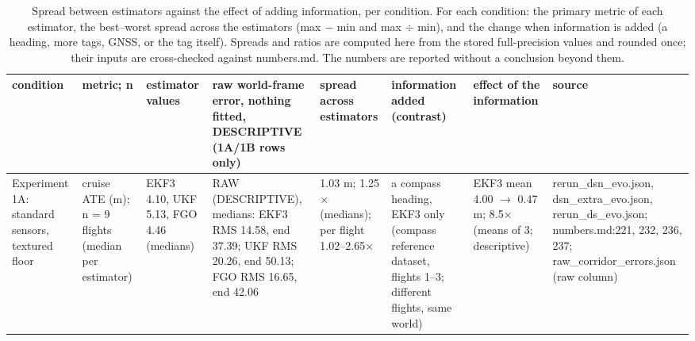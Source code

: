 \begin{table}[htbp]
\centering
\scriptsize
\caption{Spread between estimators against the effect of adding information, per condition. For each condition: the primary metric of each estimator, the best--worst spread across the estimators (max $-$ min and max $\div$ min), and the change when information is added (a heading, more tags, GNSS, or the tag itself). Spreads and ratios are computed here from the stored full-precision values and rounded once; their inputs are cross-checked against numbers.md. The numbers are reported without a conclusion beyond them.}
\label{tab:R4_information_vs_estimator}
\begin{tabular}{p{}p{}p{}p{}p{}p{}p{}p{}}
\toprule
\textbf{condition} & \textbf{metric; n} & \textbf{estimator values} & \textbf{raw world-frame error, nothing fitted, DESCRIPTIVE (1A/1B rows only)} & \textbf{spread across estimators} & \textbf{information added (contrast)} & \textbf{effect of the information} & \textbf{source} \\
\midrule
Experiment 1A: standard sensors, textured floor & cruise ATE (m); n = 9 flights (median per estimator) & EKF3 4.10, UKF 5.13, FGO 4.46 (medians) & RAW (DESCRIPTIVE), medians: EKF3 RMS 14.58, end 37.39; UKF RMS 20.26, end 50.13; FGO RMS 16.65, end 42.06 & 1.03 m; 1.25$\times$ (medians); per flight 1.02--2.65$\times$ & a compass heading, EKF3 only (compass reference dataset, flights 1--3; different flights, same world) & EKF3 mean 4.00 $\rightarrow$ 0.47 m; 8.5$\times$ (means of 3; descriptive) & rerun\_dsn\_evo.json, dsn\_extra\_evo.json, rerun\_ds\_evo.json; numbers.md:221, 232, 236, 237; raw\_corridor\_errors.json (raw column) \\

\end{tabular}
\end{table}
